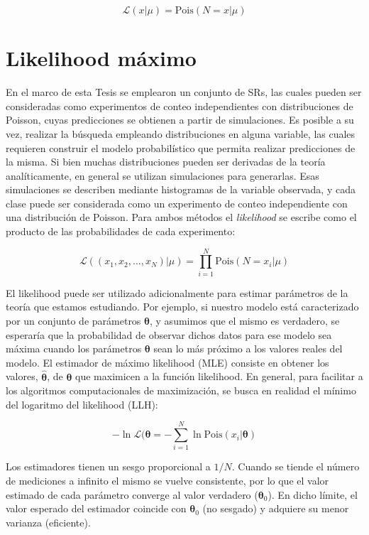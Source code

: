 \begin{equation}
	\mathcal{L}(x|\mu) = \text{Pois}(N=x|\mu) 
\end{equation}

\section{Likelihood máximo}

En el marco de esta Tesis se emplearon un conjunto de SRs, las cuales pueden ser consideradas como experimentos de conteo independientes con distribuciones de Poisson, cuyas predicciones se obtienen a partir de simulaciones.  
Es posible a su vez, realizar la búsqueda empleando distribuciones en alguna variable, las cuales requieren construir el modelo probabilístico que permita realizar predicciones de la misma. Si bien muchas distribuciones pueden ser derivadas de la teoría analíticamente, en general se utilizan simulaciones para generarlas. Esas simulaciones se describen mediante histogramas de la variable observada, y cada clase puede ser considerada como un experimento de conteo independiente con una distribución de Poisson. 
Para ambos métodos el \textit{likelihood} se escribe como el producto de las probabilidades de cada experimento:


\begin{equation}
	\mathcal{L}((x_1,x_2,...,x_N)|\mu) = \prod_{i=1}^N \text{Pois}(N=x_i|\mu) 
\end{equation}


El likelihood puede ser utilizado adicionalmente para estimar parámetros de la teoría que estamos estudiando. Por ejemplo, si nuestro modelo está caracterizado por un conjunto de parámetros $\bm{\theta}$, y asumimos que el mismo es verdadero, se esperaría que la probabilidad de observar dichos datos para ese modelo sea máxima cuando los parámetros $\bm{\theta}$ sean lo más próximo a los valores reales del modelo. El estimador de máximo likelihood (MLE) consiste en obtener los valores, $\hat{\bm{\theta}}$, de $\bm{\theta}$ que maximicen a la función likelihood. En general, para facilitar a los algoritmos computacionales de maximización, se busca en realidad el mínimo del logaritmo del likelihood (LLH):

\begin{equation}
	-\ln{\mathcal{L}(\bm{\theta}} = - \sum_{i=1}^{N}\ln{\text{Pois}(x_i|\bm{\theta})}
\end{equation}

Los estimadores tienen un sesgo proporcional a $1/N$. Cuando se tiende el número de mediciones a infinito el mismo se vuelve consistente, por lo que el valor estimado de cada parámetro converge al valor verdadero ($\bm{\theta}_0$). En dicho límite, el valor esperado del estimador coincide con $\bm{\theta}_0$ (no sesgado) y adquiere su menor varianza (eficiente).




